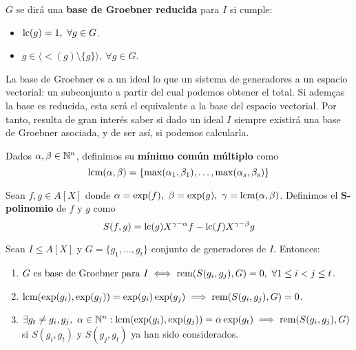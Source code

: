 \begin{definicion}
  $G$ se dirá una \textbf{base de Groebner reducida} para $I$ si cumple:
  \begin{itemize}
    \item $\text{lc}(g)=1,\ \forall g\in G$.
    \item $g\in \langle \lt(g) \setminus \{g\} \rangle,\ \forall g\in G$.
  \end{itemize}
\end{definicion}

La base de Groebner es a un ideal lo que un sistema de generadores a un espacio vectorial: un subconjunto a partir del cual podemos obtener el total. Si ademças la base es reducida, esta será el equivalente a la base del espacio vectorial. Por tanto, resulta de gran interés saber si dado un ideal $I$ siempre existirá una base de Groebner asociada, y de ser así, si podemos calcularla.

\begin{definicion}
  Dados $\alpha,\beta \in \mathbb{N}^n$, definimos su \textbf{mínimo común múltiplo} como
  \begin{equation*}
    \text{lcm}(\alpha,\beta) = \{\max(\alpha_1, \beta_1),\dots, \max(\alpha_s, \beta_s)\}
  \end{equation*}
\end{definicion}

\begin{definicion}
  Sean $f,g \in A[X]$ donde $\alpha=\exp(f),\ \beta=\exp(g),\ \gamma = \text{lcm}(\alpha,\beta)$. Definimos el \textbf{S-polinomio} de $f$ y $g$ como
  \begin{equation*}
    S(f,g) = \text{lc}(g)X^{\gamma-\alpha}f - \text{lc}(f)X^{\gamma-\beta}g
  \end{equation*}
\end{definicion}

\begin{teorema}
  Sean $I\le A[X]$ y $G=\{g_1,\dots, g_t\}$ conjunto de generadores de $I$. Entonces:
  \begin{enumerate}
    \item $G \text{ es base de Groebner para } I \iff \text{rem}(S(g_i,g_j), G)=0,\ \forall 1\le i<j\le t$.
    \item $\text{lcm}(\exp(g_i),\exp(g_j)) = \exp(g_i)\exp(g_j) \implies \text{rem}(S(g_i,g_j), G) = 0$.
    \item $\exists g_t\neq g_i,g_j,\ \alpha\in \mathbb{N}^n : \text{lcm}(\exp(g_i), \exp(g_j)) = \alpha \exp(g_t) \implies \text{rem}(S(g_i,g_j), G)$ si $S(g_i,g_t)$ y $S(g_j,g_t)$ ya han sido considerados.
  \end{enumerate}
\end{teorema}

